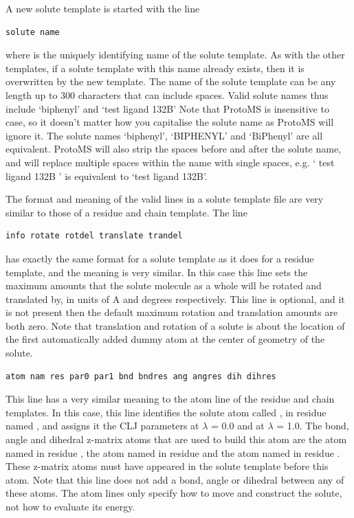 \documentclass[letterpaper,10pt,english]{sphinxmanual}
\begin{document}
A new solute template is started with the line

\begin{Verbatim}[frame=single,commandchars=\\\{\}]
solute name
\end{Verbatim}

where  is the uniquely identifying name of the solute template. As with the other templates, if a solute template with this name already exists, then it is overwritten by the new template. The name of the solute template can be any length up to 300 characters that can include spaces. Valid solute names thus include ‘biphenyl’ and ‘test ligand 132B’ Note that ProtoMS is insensitive to case, so it doesn’t matter how you capitalise the solute name as ProtoMS will ignore it. The solute names ‘biphenyl’, ‘BIPHENYL’ and ‘BiPhenyl’ are all equivalent. ProtoMS will also strip the spaces before and after the solute name, and will replace multiple spaces within the name with single spaces, e.g. ‘ test ligand 132B ’ is equivalent to ‘test ligand 132B’.

The format and meaning of the valid lines in a solute template file are very similar to those of a residue and chain template. The line

\begin{Verbatim}[frame=single,commandchars=\\\{\}]
info rotate rotdel translate trandel
\end{Verbatim}

has exactly the same format for a solute template as it does for a residue template, and the meaning is very similar. In this case this line sets the maximum amounts that the solute molecule as a whole will be rotated and translated by, in units of A and degrees respectively. This line is optional, and it is not present then the default maximum rotation and translation amounts are both zero. Note that translation and rotation of a solute is about the location of the first automatically added dummy atom at the center of geometry of the solute.

\begin{Verbatim}[frame=single,commandchars=\\\{\}]
atom nam res par0 par1 bnd bndres ang angres dih dihres
\end{Verbatim}

This line has a very similar meaning to the atom line of the residue and chain templates. In this case, this line identifies the solute atom called , in residue named , and assigns it the CLJ parameters  at \(\lambda\) = 0.0 and  at \(\lambda\) = 1.0. The bond, angle and dihedral z-matrix atoms that are used to build this atom are the atom named  in residue , the atom named  in residue  and the atom named  in residue . These z-matrix atoms must have appeared in the solute template before this atom. Note that this line does not add a bond, angle or dihedral between any of these atoms. The atom lines only specify how to move and construct the solute, not how to evaluate its energy.
\end{document}
